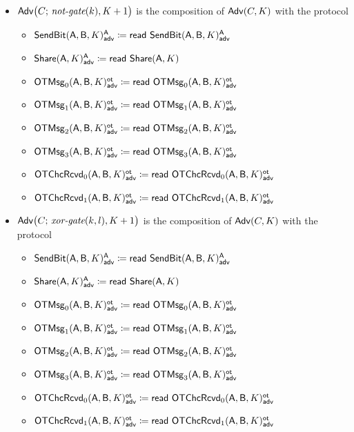 \begin{itemize}
\item $\Adv\big(C; \, \notgate(k),K+1\big)$ is the composition of $\Adv(C,K)$ with the protocol
\begin{itemize}
\item {\color{blue} $\LeakSendBit(\A,\B,K)^\A_\adv \coloneqq \read{\LeakSendBit(\A,\B,K)^\A_\adv}$}
\item {\color{blue} $\LeakShare(\A,K)^\A_\adv \coloneqq \read{\Share(\A,K)}$}\smallskip
\item {\color{blue} $\LeakOTMsg_0(\A,\B,K)^\ot_\adv \coloneqq \read{\LeakOTMsg_0(\A,\B,K)^\ot_\adv}$}
\item {\color{blue} $\LeakOTMsg_1(\A,\B,K)^\ot_\adv \coloneqq \read{\LeakOTMsg_1(\A,\B,K)^\ot_\adv}$}
\item {\color{blue} $\LeakOTMsg_2(\A,\B,K)^\ot_\adv \coloneqq \read{\LeakOTMsg_2(\A,\B,K)^\ot_\adv}$}
\item {\color{blue} $\LeakOTMsg_3(\A,\B,K)^\ot_\adv \coloneqq \read{\LeakOTMsg_3(\A,\B,K)^\ot_\adv}$}\smallskip
\item {\color{blue} $\LeakOTChcRcvd_0(\A,\B,K)^\ot_\adv \coloneqq \read{\LeakOTChcRcvd_0(\A,\B,K)^\ot_\adv}$}
\item {\color{blue} $\LeakOTChcRcvd_1(\A,\B,K)^\ot_\adv \coloneqq \read{\LeakOTChcRcvd_1(\A,\B,K)^\ot_\adv}$}
\end{itemize}

\item $\Adv\big(C; \, \xorgate(k,l),K+1\big)$ is the composition of $\Adv(C,K)$ with the protocol
\begin{itemize}
\item {\color{blue} $\LeakSendBit(\A,\B,K)^\A_\adv \coloneqq \read{\LeakSendBit(\A,\B,K)^\A_\adv}$}
\item {\color{blue} $\LeakShare(\A,K)^\A_\adv \coloneqq \read{\Share(\A,K)}$}\smallskip
\item {\color{blue} $\LeakOTMsg_0(\A,\B,K)^\ot_\adv \coloneqq \read{\LeakOTMsg_0(\A,\B,K)^\ot_\adv}$}
\item {\color{blue} $\LeakOTMsg_1(\A,\B,K)^\ot_\adv \coloneqq \read{\LeakOTMsg_1(\A,\B,K)^\ot_\adv}$}
\item {\color{blue} $\LeakOTMsg_2(\A,\B,K)^\ot_\adv \coloneqq \read{\LeakOTMsg_2(\A,\B,K)^\ot_\adv}$}
\item {\color{blue} $\LeakOTMsg_3(\A,\B,K)^\ot_\adv \coloneqq \read{\LeakOTMsg_3(\A,\B,K)^\ot_\adv}$}\smallskip
\item {\color{blue} $\LeakOTChcRcvd_0(\A,\B,K)^\ot_\adv \coloneqq \read{\LeakOTChcRcvd_0(\A,\B,K)^\ot_\adv}$}
\item {\color{blue} $\LeakOTChcRcvd_1(\A,\B,K)^\ot_\adv \coloneqq \read{\LeakOTChcRcvd_1(\A,\B,K)^\ot_\adv}$}
\end{itemize}


\end{itemize}
